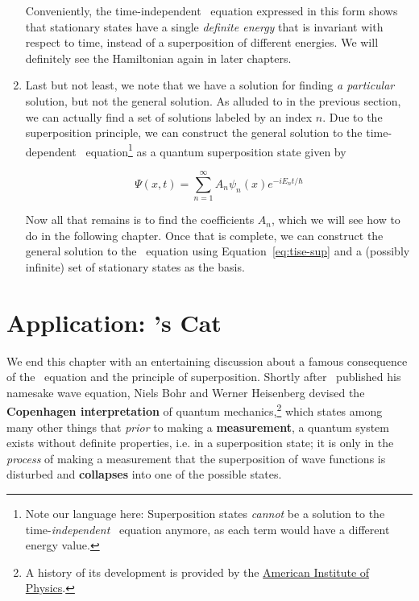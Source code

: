 \begin{enumerate}[1.]
	Conveniently, the time-independent \Sch\ equation expressed in this form shows that stationary states have a single \emph{definite energy} that is invariant with respect to time, instead of a superposition of different energies. We will definitely see the Hamiltonian again in later chapters.
	
	\item Last but not least, we note that we have a solution for finding \emph{a particular} solution, but not the general solution. As alluded to in the previous section, we can actually find a set of solutions labeled by an index $n$. Due to the superposition principle, we can construct the general solution to the time-dependent \Sch\ equation\footnote{Note our language here: Superposition states \emph{cannot} be a solution to the time-\emph{independent} \Sch\ equation anymore, as each term would have a different energy value.} as a quantum superposition state given by
	\begin{tcolorbox}[title = Superposition of states] \vspace{-2ex}
		\begin{equation}
		\Psi(x,t) = \sum_{n=1}^{\infty} A_n\psi_n(x)e^{-iE_nt/\hbar} \label{eq:tise-sup}
		\end{equation}
	\end{tcolorbox}
	Now all that remains is to find the coefficients $A_n$, which we will see how to do in the following chapter. Once that is complete, we can construct the general solution to the \Sch\ equation using Equation~\ref{eq:tise-sup} and a (possibly infinite) set of stationary states as the basis.
\end{enumerate}


\section[\Sch's Cat]{Application: \Sch's Cat}
We end this chapter with an entertaining discussion about a famous consequence of the \Sch\ equation and the principle of superposition. Shortly after \Sch\ published his namesake wave equation, Niels Bohr and Werner Heisenberg devised the \textbf{Copenhagen interpretation} of quantum mechanics,\footnote{A history of its development is provided by the \href{http://history.aip.org/exhibits/heisenberg/p09.htm}{American Institute of Physics}.} which states among many other things that \emph{prior} to making a \textbf{measurement}, a quantum system exists without definite properties, i.e. in a superposition state; it is only in the \emph{process} of making a measurement that the superposition of wave functions is disturbed and \textbf{collapses} into one of the possible states. \par 

